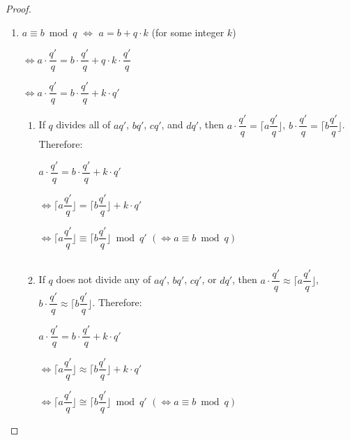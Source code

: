 \begin{proof}

$ $

\begin{enumerate}
\item $a \equiv b \bmod q$ $\Longleftrightarrow$ $a = b + q\cdot k$ (for some integer $k$)

$\Longleftrightarrow a \cdot \dfrac{q'}{q} = b \cdot \dfrac{q'}{q} + q\cdot k \cdot \dfrac{q'}{q}$

$\Longleftrightarrow a \cdot \dfrac{q'}{q} = b \cdot \dfrac{q'}{q} + k\cdot q'$



\begin{enumerate}
\item If $q$ divides all of $aq'$, $bq'$, $cq'$, and $dq'$, then $a \cdot \dfrac{q'}{q} = \Bigg\lceil a\dfrac{q'}{q}\Bigg\rfloor$, $b \cdot \dfrac{q'}{q} = \Bigg\lceil b\dfrac{q'}{q}\Bigg\rfloor$. Therefore:

$a \cdot \dfrac{q'}{q} = b \cdot \dfrac{q'}{q} + k\cdot q'$

$\Longleftrightarrow \Bigg\lceil a\dfrac{q'}{q}\Bigg\rfloor = \Bigg\lceil b\dfrac{q'}{q}\Bigg\rfloor + k\cdot q'$

$\Longleftrightarrow \Bigg\lceil a\dfrac{q'}{q}\Bigg\rfloor \equiv \Bigg\lceil b\dfrac{q'}{q}\Bigg\rfloor \bmod q'$ \text{ } $(\Longleftrightarrow a \equiv b \bmod q)$

$ $

\item If $q$ does not divide any of $aq'$, $bq'$, $cq'$, or $dq'$, then $a \cdot \dfrac{q'}{q} \approx \Bigg\lceil a\dfrac{q'}{q}\Bigg\rfloor$, \text{ } $b \cdot \dfrac{q'}{q} \approx \Bigg\lceil b\dfrac{q'}{q}\Bigg\rfloor$. Therefore:

$a \cdot \dfrac{q'}{q} = b \cdot \dfrac{q'}{q} + k\cdot q'$

$\Longleftrightarrow \Bigg\lceil a\dfrac{q'}{q}\Bigg\rfloor \approx \Bigg\lceil b\dfrac{q'}{q}\Bigg\rfloor + k\cdot q'$

$\Longleftrightarrow \Bigg\lceil a\dfrac{q'}{q}\Bigg\rfloor \cong \Bigg\lceil b\dfrac{q'}{q}\Bigg\rfloor \bmod q'$ \text{ } $(\Longleftrightarrow a \equiv b \bmod q)$

\end{enumerate}


\end{enumerate}
\end{proof}
